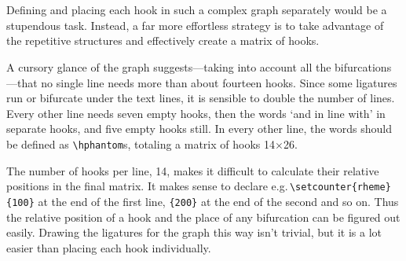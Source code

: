 \documentclass[a4paper,justified]{tufte-handout}
\newcommand{\lm}{\fontfamily{cmr}\selectfont}
\begin{document}
{{{{\setcounter{rheme}{440}\\
\hk{} \ \hk{} \ \hk{} \ \hk{} \ \hk{} \ \hk{} \ \hk{} \ \hk{}\hphantom{and} \ \hk{}\hphantom{in} \ \hk{}\hphantom{line} \ \hk{}\hphantom{with} \ \hk{} \ \hk{}
\setcounter{rheme}{460}
}
\setcounter{rheme}{0}
}}
}

Defining and placing each hook in such a complex graph separately would be a stupendous task. Instead, a far more effortless strategy is to take advantage of the repetitive structures and effectively create a matrix of hooks.

A cursory glance of the graph suggests---taking into account all the bifurcations---that no single line needs more than about fourteen hooks. Since some ligatures run or bifurcate under the text lines, it is sensible to double the number of lines. Every other line needs seven empty hooks, then the words `{\lm and in line with}' in separate hooks, and five empty hooks still. In every other line, the words should be defined as \verb|\hphantom|s, totaling a matrix of hooks 14$\times$26.

The number of hooks per line, 14, makes it difficult to calculate their relative positions in the final matrix. It makes sense to declare e.g.\,\verb|\setcounter{rheme}{100}| at the end of the first line, \verb|{200}|\label{rhemecounter} at the end of the second and so on. Thus the relative position of a hook and the place of any bifurcation can be figured out easily. Drawing the ligatures for the graph this way isn't trivial, but it is a lot easier than placing each hook individually.
\end{document}
